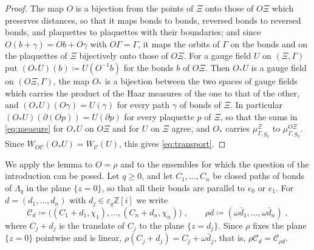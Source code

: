 \documentclass[11pt]{preprint}
\numberwithin{equation}{section}
\theoremstyle{definition}
\theoremstyle{remark}
\theoremstyle{plain}
\begin{document}
\begin{proof}
The map $O$ is a bijection from the points of $\Xi$ onto those of $O\Xi$ which preserves distances, so that it maps bonds to bonds, reversed bonds to reversed bonds, and plaquettes to plaquettes with their boundaries; and since $O(b + \gamma) = Ob + O\gamma$ with $O\Gamma = \Gamma$, it maps the orbits of $\Gamma$ on the bonds and on the plaquettes of $\Xi$ bijectively onto those of $O\Xi$. For a gauge field $U$ on $(\Xi, \Gamma)$ put $(O_*U)(b) \coloneqq U(O^{-1}b)$ for the bonds $b$ of $O\Xi$. Then $O_*U$ is a gauge field on $(O\Xi, \Gamma)$, the map $O_*$ is a bijection between the two spaces of gauge fields which carries the product of the Haar measures of the one to that of the other, and $(O_*U)(O\gamma) = U(\gamma)$ for every path $\gamma$ of bonds of $\Xi$. In particular $(O_*U)(\partial(Op)) = U(\partial p)$ for every plaquette $p$ of $\Xi$, so that the sums in \eqref{eq:measure} for $O_*U$ on $O\Xi$ and for $U$ on $\Xi$ agree, and $O_*$ carries $\mu^\Xi_{\Gamma,g_0}$ to $\mu^{O\Xi}_{\Gamma,g_0}$. Since $W_{O\mathcal C}(O_*U) = W_{\mathcal C}(U)$, this gives \eqref{eq:transport}.
\end{proof}

We apply the lemma to $O = \rho$ and to the ensembles for which the question of the introduction can be posed. Let $q \geq 0$, and let $C_1, \dots, C_n$ be closed paths of bonds of $\Lambda_q$ in the plane $\{ z = 0 \}$, so that all their bonds are parallel to $e_0$ or $e_1$. For $d = (d_1, \dots, d_n)$ with $d_j \in \varepsilon_q\mathbb Z[i]$ we write
\begin{equation}\label{eq:planar-ensemble}
    \mathcal C_d \coloneqq \bigl((C_1 + d_1, \chi_1), \dots, (C_n + d_n, \chi_n)\bigr)\;,
    \qquad
    \rho d \coloneqq (\omega\bar d_1, \dots, \omega\bar d_n)\;,
\end{equation}
where $C_j + d_j$ is the translate of $C_j$ to the plane $\{ z = d_j \}$. Since $\rho$ fixes the plane $\{ z = 0 \}$ pointwise and is linear, $\rho(C_j + d_j) = C_j + \omega\bar d_j$, that is, $\rho\mathcal C_d = \mathcal C_{\rho d}$.
\end{document}
